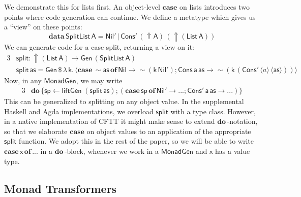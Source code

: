 \documentclass[acmsmall,screen,review,anonymous]{acmart}
\newcommand{\mit}[1]{{\mathsf{#1}}}
\newcommand{\msf}[1]{{\mathsf{#1}}}
\newcommand{\mbf}[1]{{\mathbf{#1}}}
\newcommand{\bs}[1]{\boldsymbol{#1}}
\newcommand{\mdo}{\mbf{do}\,}
\newcommand{\ind}{\hspace{1em}}
\newcommand{\lam}{\lambda\,}
\newcommand{\data}{\mbf{data}\,}
\newcommand{\of}{\mbf{of}\,}
\newcommand{\vas}{\mathsf{as}}
\newcommand{\vk}{\mathsf{k}}
\newcommand{\vA}{\mathsf{A}}
\newcommand{\va}{\mathsf{a}}
\newcommand{\vx}{\mathsf{x}}
\newcommand{\List}{\msf{List}}
\newcommand{\Nil}{\msf{Nil}}
\newcommand{\Cons}{\msf{Cons}}
\newcommand{\fro}{\leftarrow}
\newcommand{\case}{\mbf{case\,}}
\newcommand{\Up}{{\Uparrow}}
\newcommand{\spl}{{\bs{\sim}}}
\newcommand{\ql}{{\bs{\langle}}}
\newcommand{\qr}{{\bs{\rangle}}}
\theoremstyle{remark}
\newcommand{\Gen}{\msf{Gen}}
\newcommand{\qt}[1]{\ql#1\qr}
\newcommand{\liftGen}{\mit{liftGen}}
\newcommand{\MonadGen}{\msf{MonadGen}}
\newcommand{\dlr}{\,\$\,}
\begin{document}
We demonstrate this for lists first. An object-level $\mbf{case}$ on lists introduces
two points where code generation can continue. We define a metatype which gives
us a ``view'' on these points:
\[ \data \msf{SplitList}\,\vA = \Nil'\,|\,\Cons'\,(\Up \vA)\,(\Up (\List\,\vA)) \]
We can generate code for a case split, returning a view on it:
\begin{alignat*}{3}
  &\mit{split} : \Up (\List\,\vA) \to \Gen\,(\msf{SplitList}\,\vA)\\
  &\mit{split}\,\vas = \Gen \dlr \lam \vk.\,\qt{\case \spl \vas\,\of \Nil \to \spl(\vk\,\Nil'); \Cons\,\va\,\vas \to \spl(\vk\,(\Cons'\,\qt{a}\,\qt{\vas}))}
\end{alignat*}
Now, in any $\MonadGen$, we may write
\begin{alignat*}{3}
  &\mdo \{\mit{sp} \fro \liftGen\;(\!\mit{split}\,\vas);(\case \mit{sp}\,\of \Nil' \to ...;\Cons'\,\va\,\vas \to ...)\}
\end{alignat*}
This can be generalized to splitting on any object value. In the supplemental
Haskell and Agda implementations, we overload $\mit{split}$ with a type
class. However, in a native implementation of CFTT it might make sense to extend
$\mdo$-notation, so that we elaborate $\mbf{case}$ on object values to an
application of the appropriate $\mit{split}$ function. We adopt this in the rest
of the paper, so we will be able to write $\case \vx\,\of ...$ in a $\mdo$-block,
whenever we work in a $\MonadGen$ and $\vx$ has a value type.

\subsection{Monad Transformers}\label{monad-transformers}
\end{document}
